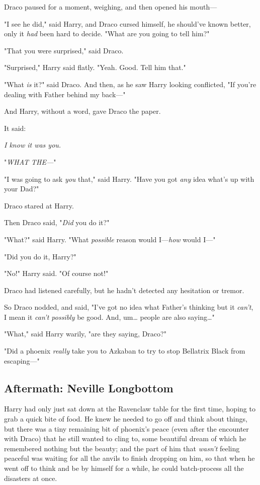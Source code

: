 Draco paused for a moment, weighing, and then opened his mouth---

"I see he did," said Harry, and Draco cursed himself, he should've known 
better, only it \emph{had} been hard to decide. "What are you going to tell 
him?"

"That you were surprised," said Draco.

"Surprised," Harry said flatly. "Yeah. Good. Tell him that."

"What \emph{is} it?" said Draco. And then, as he saw Harry looking conflicted, 
"If you're dealing with Father behind my back---"

And Harry, without a word, gave Draco the paper.

It said:

\emph{I know it was you.}

"\emph{WHAT THE---}"

"I was going to ask \emph{you} that," said Harry. "Have you got \emph{any} idea 
what's up with your Dad?"

Draco stared at Harry.

Then Draco said, "\emph{Did} you do it?"

"What?" said Harry. "What \emph{possible} reason would I---\emph{how} would 
I---"

"Did you do it, Harry?"

"No!" Harry said. "Of course not!"

Draco had listened carefully, but he hadn't detected any hesitation or tremor.

So Draco nodded, and said, "I've got no idea what Father's thinking but it 
\emph{can't}, I mean it \emph{can't possibly} be good. And, um{\ldots} people 
are also saying{\ldots}"

"What," said Harry warily, "are they saying, Draco?"

"Did a phoenix \emph{really} take you to Azkaban to try to stop Bellatrix Black 
from escaping---"
\sbreak
\subsection{Aftermath: Neville Longbottom}

Harry had only just sat down at the Ravenclaw table for the first time, hoping 
to grab a quick bite of food. He knew he needed to go off and think about 
things, but there was a tiny remaining bit of phoenix's peace (even after the 
encounter with Draco) that he still wanted to cling to, some beautiful dream of 
which he remembered nothing but the beauty; and the part of him that 
\emph{wasn't} feeling peaceful was waiting for all the anvils to finish 
dropping on him, so that when he went off to think and be by himself for a 
while, he could batch-process all the disasters at once.

